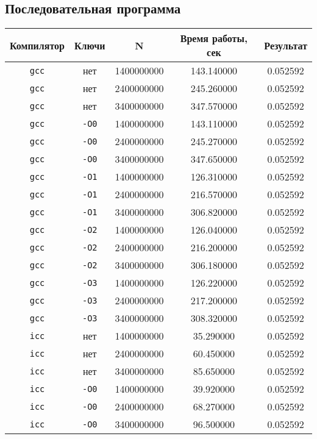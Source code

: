 \documentclass[a4paper,12pt]{article}
\begin{document}
\subsection{Последовательная программа}
\begin{tabular}{c | c | c c c}
\textbf{Компилятор} & \textbf{Ключи} & \textbf{N} & \textbf{Время работы, сек} & \textbf{Результат}\\
\hline
\texttt{gcc} & нет & 1400000000 & 143.140000 & 0.052592\\
\texttt{gcc} & нет & 2400000000 & 245.260000 & 0.052592\\
\texttt{gcc} & нет & 3400000000 & 347.570000 & 0.052592\\
\hline
\texttt{gcc} & \texttt{-O0} & 1400000000 & 143.110000 & 0.052592\\
\texttt{gcc} & \texttt{-O0} & 2400000000 & 245.270000 & 0.052592\\
\texttt{gcc} & \texttt{-O0} & 3400000000 & 347.650000 & 0.052592\\
\hline
\texttt{gcc} & \texttt{-O1} & 1400000000 & 126.310000 & 0.052592\\
\texttt{gcc} & \texttt{-O1} & 2400000000 & 216.570000 & 0.052592\\
\texttt{gcc} & \texttt{-O1} & 3400000000 & 306.820000 & 0.052592\\
\hline
\texttt{gcc} & \texttt{-O2} & 1400000000 & 126.040000 & 0.052592\\
\texttt{gcc} & \texttt{-O2} & 2400000000 & 216.200000 & 0.052592\\
\texttt{gcc} & \texttt{-O2} & 3400000000 & 306.180000 & 0.052592\\
\hline
\texttt{gcc} & \texttt{-O3} & 1400000000 & 126.220000 & 0.052592\\
\texttt{gcc} & \texttt{-O3} & 2400000000 & 217.200000 & 0.052592\\
\texttt{gcc} & \texttt{-O3} & 3400000000 & 308.320000 & 0.052592\\
\hline
\hline
\texttt{icc} & нет & 1400000000 & 35.290000 & 0.052592\\
\texttt{icc} & нет & 2400000000 & 60.450000 & 0.052592\\
\texttt{icc} & нет & 3400000000 & 85.650000 & 0.052592\\
\hline
\texttt{icc} & \texttt{-O0} & 1400000000 & 39.920000 & 0.052592\\
\texttt{icc} & \texttt{-O0} & 2400000000 & 68.270000 & 0.052592\\
\texttt{icc} & \texttt{-O0} & 3400000000 & 96.500000 & 0.052592\\

\end{tabular}
\end{document}
